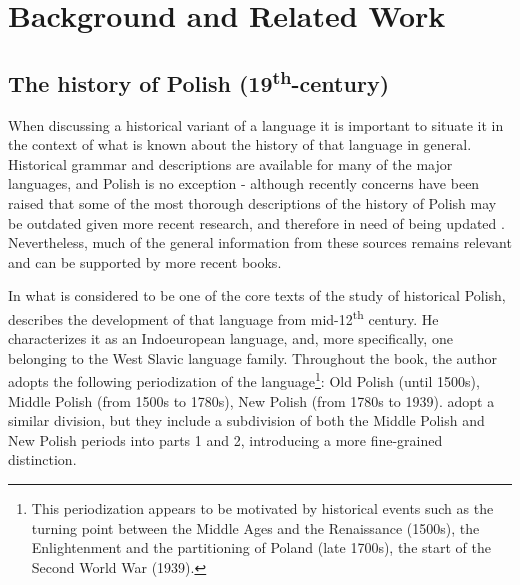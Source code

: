 \section{Background and Related Work}
\label{sec:background}

\subsection{The history of Polish (19\textsuperscript{th}-century)}
\label{subsec:history-pl}

When discussing a historical variant of a language it is important to situate it in the context of what is known about the history of that language in general. Historical grammar and descriptions are available for many of the major languages, and Polish is no exception - although recently concerns have been raised that some of the most thorough descriptions of the history of Polish may be outdated given more recent research, and therefore in need of being updated \citep{dunaj_19}. Nevertheless, much of the general information from these sources remains relevant and can be supported by more recent books.

In what is considered to be one of the core texts of the study of historical Polish, \citet{klemensiewicz_76} describes the development of that language from mid-12\textsuperscript{th} century. He characterizes it as an Indoeuropean language, and, more specifically, one belonging to the West Slavic language family. Throughout the book, the author adopts the following periodization of the language\footnote{This periodization appears to be motivated by historical events such as the turning point between the Middle Ages and the Renaissance (1500s), the Enlightenment and the partitioning of Poland (late 1700s), the start of the Second World War (1939).}: Old Polish (until 1500s), Middle Polish (from 1500s to 1780s), New Polish (from 1780s to 1939). \citet{długosz-kurczabowa_dubisz_2006} adopt a similar division, but they include a subdivision of both the Middle Polish and New Polish periods into parts 1 and 2, introducing a more fine-grained distinction. 

